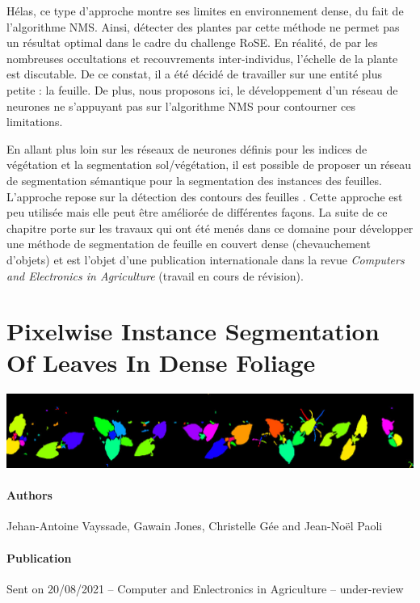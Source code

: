 \documentclass[../thesis.tex]{subfiles}
\begin{document}
    Hélas, ce type d'approche montre ses limites en environnement dense, du fait de l'algorithme NMS. Ainsi, détecter des plantes par cette méthode ne permet pas un résultat optimal dans le cadre du challenge RoSE. En réalité, de par les nombreuses occultations et recouvrements inter-individus, l'échelle de la plante est discutable. De ce constat, il a été décidé de travailler sur une entité plus petite : la feuille. De plus, nous proposons ici, le développement d'un réseau de neurones ne s'appuyant pas sur l'algorithme NMS pour contourner ces limitations.
    
    En allant plus loin sur les réseaux de neurones définis pour les indices de végétation et la segmentation sol/végétation, il est possible de proposer un réseau de segmentation sémantique pour la segmentation des instances des feuilles. L'approche repose sur la détection des contours des feuilles \cite{morris2018pyramid}. Cette approche est peu utilisée mais elle peut être améliorée de différentes façons. La suite de ce chapitre porte sur les travaux qui ont été menés dans ce domaine pour développer une méthode de segmentation de feuille en couvert dense (chevauchement d'objets) et est l'objet d'une publication internationale dans la revue \textit{Computers and Electronics in Agriculture} (travail en cours de révision). %
	
	\newpage
    \null
    \vfill
	\section*{Pixelwise Instance Segmentation Of Leaves In Dense Foliage}
	
	\noindent
	\includegraphics[width=\linewidth]{img/leaf/graphical-gca}
	
	\paragraph{Authors} Jehan-Antoine Vayssade, Gawain Jones, Christelle Gée and Jean-Noël Paoli
	
	\paragraph{Publication} Sent on 20/08/2021 -- Computer and Enlectronics in Agriculture -- under-review  %
		
\end{document}
